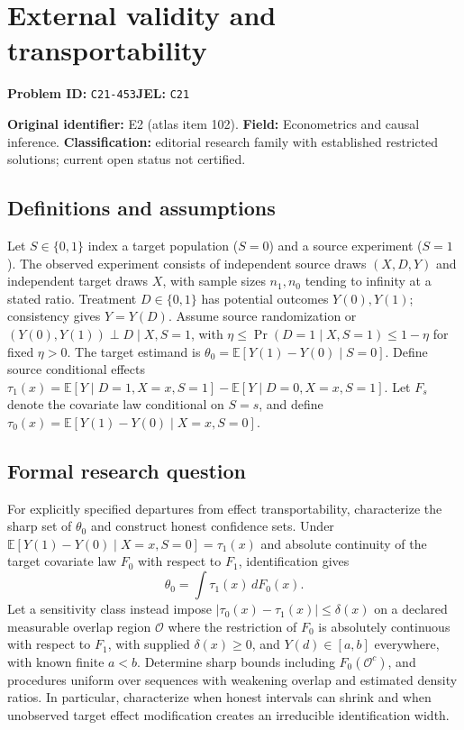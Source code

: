 \documentclass[11pt,a4paper]{article}
\begin{document}
\section*{External validity and transportability}
\textbf{Problem ID:} \texttt{C21-453}\quad \textbf{JEL:} \texttt{C21}\par
\label{problem:OP-0102}
\label{atlas:prob:E2}

\noindent\textbf{Original identifier:} E2 (atlas item 102). \textbf{Field:} Econometrics and causal inference. \textbf{Classification:} editorial research family with established restricted solutions; current open status not certified.

\subsection*{Definitions and assumptions}

Let $S\in\{0,1\}$ index a target population ($S=0$) and a source experiment ($S=1$). The observed experiment consists of independent source draws $(X,D,Y)$ and independent target draws $X$, with sample sizes $n_1,n_0$ tending to infinity at a stated ratio. Treatment $D\in\{0,1\}$ has potential outcomes $Y(0),Y(1)$; consistency gives $Y=Y(D)$. Assume source randomization or $(Y(0),Y(1))\perp D\mid X,S=1$, with $\eta\le\Pr(D=1\mid X,S=1)\le1-\eta$ for fixed $\eta>0$. The target estimand is $\theta_0=\mathbb E[Y(1)-Y(0)\mid S=0]$. Define source conditional effects $\tau_1(x)=\mathbb E[Y\mid D=1,X=x,S=1]-\mathbb E[Y\mid D=0,X=x,S=1]$. Let $F_s$ denote the covariate law conditional on $S=s$, and define $\tau_0(x)=\mathbb E[Y(1)-Y(0)\mid X=x,S=0]$.

\subsection*{Formal research question}

For explicitly specified departures from effect transportability, characterize the sharp set of $\theta_0$ and construct honest confidence sets. Under $\mathbb E[Y(1)-Y(0)\mid X=x,S=0]=\tau_1(x)$ and absolute continuity of the target covariate law $F_0$ with respect to $F_1$, identification gives
\[
\theta_0=\int\tau_1(x)\,dF_0(x).
\]
Let a sensitivity class instead impose $|\tau_0(x)-\tau_1(x)|\le\delta(x)$ on a declared measurable overlap region $\mathcal O$ where the restriction of $F_0$ is absolutely continuous with respect to $F_1$, with supplied $\delta(x)\ge0$, and $Y(d)\in[a,b]$ everywhere, with known finite $a<b$. Determine sharp bounds including $F_0(\mathcal O^c)$, and procedures uniform over sequences with weakening overlap and estimated density ratios. In particular, characterize when honest intervals can shrink and when unobserved target effect modification creates an irreducible identification width.
\end{document}
